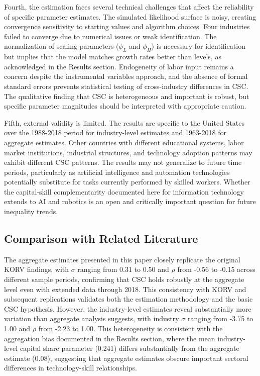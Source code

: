 \documentclass[12pt]{article}
\begin{document}
Fourth, the estimation faces several technical challenges that affect the reliability of specific parameter estimates. The simulated likelihood surface is noisy, creating convergence sensitivity to starting values and algorithm choices. Four industries failed to converge due to numerical issues or weak identification. The normalization of scaling parameters ($\phi_L$ and $\phi_H$) is necessary for identification but implies that the model matches growth rates better than levels, as acknowledged in the Results section. Endogeneity of labor input remains a concern despite the instrumental variables approach, and the absence of formal standard errors prevents statistical testing of cross-industry differences in CSC. The qualitative finding that CSC is heterogeneous and important is robust, but specific parameter magnitudes should be interpreted with appropriate caution.

Fifth, external validity is limited. The results are specific to the United States over the 1988-2018 period for industry-level estimates and 1963-2018 for aggregate estimates. Other countries with different educational systems, labor market institutions, industrial structures, and technology adoption patterns may exhibit different CSC patterns. The results may not generalize to future time periods, particularly as artificial intelligence and automation technologies potentially substitute for tasks currently performed by skilled workers. Whether the capital-skill complementarity documented here for information technology extends to AI and robotics is an open and critically important question for future inequality trends.

\subsection{Comparison with Related Literature}\label{sec:comparison}

The aggregate estimates presented in this paper closely replicate the original KORV findings, with $\sigma$ ranging from 0.31 to 0.50 and $\rho$ from -0.56 to -0.15 across different sample periods, confirming that CSC holds robustly at the aggregate level even with extended data through 2018. This consistency with KORV and subsequent replications validates both the estimation methodology and the basic CSC hypothesis. However, the industry-level estimates reveal substantially more variation than aggregate analysis suggests, with industry $\sigma$ ranging from -3.75 to 1.00 and $\rho$ from -2.23 to 1.00. This heterogeneity is consistent with the aggregation bias documented in the Results section, where the mean industry-level capital share parameter (0.241) differs substantially from the aggregate estimate (0.08), suggesting that aggregate estimates obscure important sectoral differences in technology-skill relationships.
\end{document}

